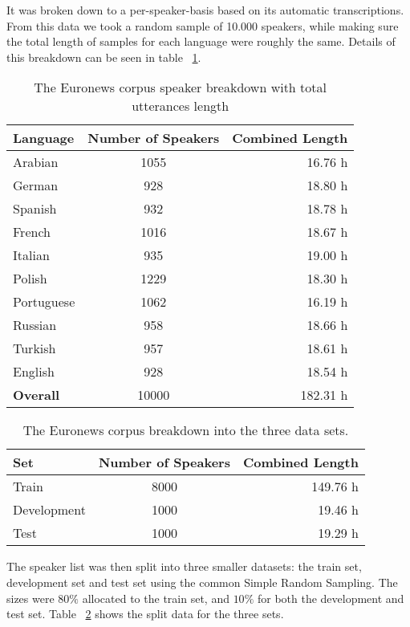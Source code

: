 It was broken down to a per-speaker-basis based on its automatic transcriptions. From this data we took a random sample of 10.000 speakers, while making sure the total length of samples for each language were roughly the same. Details of this breakdown can be seen in table ~\ref{tab:spkData}.


\begin{table}[h!]
\label{tab:spkData}
\centering
\begin{tabular}{| l | c | r | }
	\hline
	\textbf{Language} & \textbf{Number of Speakers} & \textbf{Combined Length} \\
	\hline
	Arabian & 1055 & 16.76 h \\
	German & 928 & 18.80 h \\
	Spanish & 932 & 18.78 h \\
	French & 1016 & 18.67 h \\  
	Italian & 935 & 19.00 h \\  
	Polish & 1229 & 18.30 h \\ 
	Portuguese & 1062 & 16.19 h \\ 
	Russian & 958 & 18.66 h \\ 
	Turkish & 957 & 18.61 h \\  
	English & 928 & 18.54 h \\ 
	\hline
	\textbf{Overall} & 10000 & 182.31 h\\
	\hline
	
\end{tabular}
\caption{The Euronews corpus speaker breakdown with total utterances length}
\end{table}

\begin{table}[h!]
\label{tab:spkSplit}
\centering
\begin{tabular}{| l | c | r | }
	\hline
	\textbf{Set} & \textbf{Number of Speakers} & \textbf{Combined Length} \\
	\hline
	Train &  8000 & 149.76 h \\
	Development & 1000 & 19.46 h \\
	Test & 1000 & 19.29 h \\
	\hline
\end{tabular}
\caption{The Euronews corpus breakdown into the three data sets.}
\end{table}

The speaker list was then split into three smaller datasets: the train set, development set and test set using the common Simple Random Sampling. The sizes were \(80\%\) allocated to the train set, and \(10\%\) for both the development and test set. Table ~\ref{tab:spkSplit} shows the split data for the three sets. 

